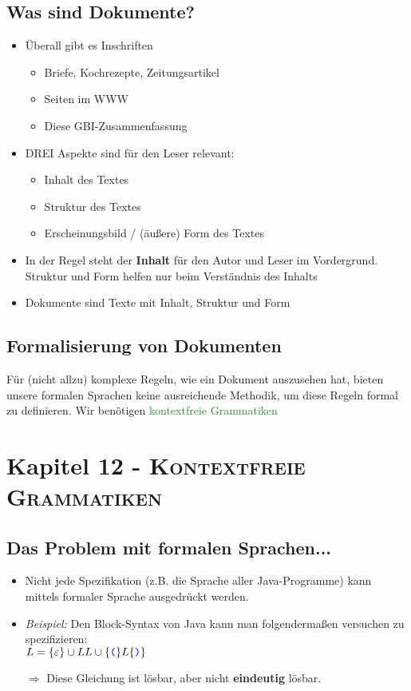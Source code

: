 \documentclass{article}
\newcommand{\kapitel}[2]{Kapitel #1 - \textsc{#2}}
\newcommand{\blue}[1]{\textcolor{blue}{#1}}
\newcommand{\strongColor}[1]{\textcolor{strongColor}{#1}}
\newcommand{\strong}[1]{\textbf{\strongColor{#1}}}
\newcommand{\important}[1]{\textcolor{importantColor}{#1}}
\newcommand{\verweis}[1]{\textcolor{ForestGreen}{#1}}
\newcommand{\example}[1]{\textit{Beispiel: }#1}
\newcommand{\word}[1]{\blue{\texttt{#1}}}
\newcommand{\set}[1]{\{#1\}}
\begin{document}
\subsection{Was sind Dokumente?}
\begin{itemize}
    \item Überall gibt es Inschriften
    \begin{itemize}
        \item Briefe, Kochrezepte, Zeitungsartikel
        \item Seiten im WWW
        \item Diese GBI-Zusammenfassung
    \end{itemize}
    \item DREI Aspekte sind für den Leser relevant:
    \begin{itemize}
        \item \important{Inhalt} des Textes
        \item \important{Struktur} des Textes
        \item \important{Erscheinungsbild} / (äußere) \important{Form} des Textes
    \end{itemize}
    \item In der Regel steht der \strong{Inhalt} für den Autor und Leser im Vordergrund.\\
    Struktur und Form helfen nur beim Verständnis des Inhalts
    \item \important{Dokumente} sind Texte mit Inhalt, Struktur und Form
\end{itemize}
\subsection{Formalisierung von Dokumenten}
Für (nicht allzu) komplexe Regeln, wie ein Dokument auszusehen hat, bieten unsere formalen Sprachen keine ausreichende Methodik, um diese Regeln formal zu definieren. Wir benötigen \verweis{kontextfreie Grammatiken} 

\newpage
\section{\kapitel{12}{Kontextfreie Grammatiken}}
\subsection{Das Problem mit formalen Sprachen...}
\begin{itemize}
    \item Nicht jede Spezifikation (z.B. die Sprache aller Java-Programme) kann mittels formaler Sprache ausgedrückt werden.
    \item \example{Den Block-Syntax von Java kann man folgendermaßen versuchen zu spezifizieren:\\$L=\set{\varepsilon}\cup LL\cup\set{\word{(}}L\set{\word{)}}$}
    \item[$\Rightarrow$]Diese Gleichung ist \important{lösbar}, aber nicht \important{\strong{eindeutig} lösbar}.
\end{itemize}
\end{document}
